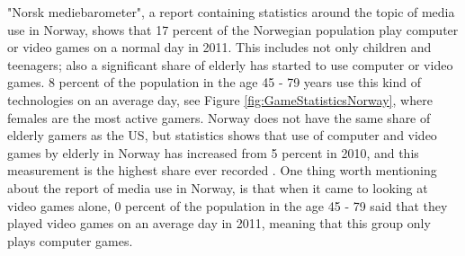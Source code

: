 "Norsk mediebarometer", a report containing statistics around the topic of media use in Norway, shows that 17 percent of the Norwegian population play computer or video games on a normal day in 2011. This includes not only children and teenagers; also a significant share of elderly has started to use computer or video games. 8 percent of the population in the age 45 - 79 years use this kind of technologies on an average day, see Figure \ref{fig:GameStatisticsNorway}, where females are the most active gamers. Norway does not have the same share of elderly gamers as the US, but statistics shows that use of computer and video games by elderly in Norway has increased from 5 percent in 2010, and this measurement is the highest share ever recorded \cite{ssb2010} \cite{ssb2011}. One thing worth mentioning about the report of media use in Norway, is that when it came to looking at video games alone, 0 percent of the population in the age 45 - 79 said that they played video games on an average day in 2011, meaning that this group only plays computer games. \cite{ssb2011}

